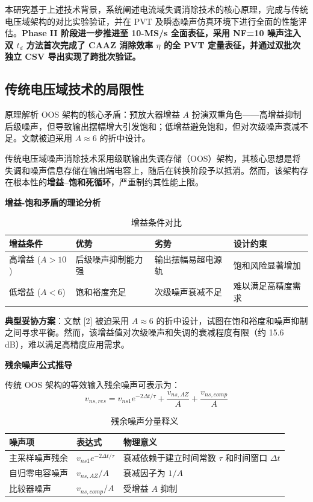 \documentclass[11pt,a4paper,UTF8]{ctexart}
\begin{document}
本研究基于上述技术背景，系统阐述电流域失调消除技术的核心原理，完成与传统电压域架构的对比实验验证，并在 PVT 及瞬态噪声仿真环境下进行全面的性能评估。\textbf{Phase II 阶段进一步推进至 10-MS/s 全面表征，采用 NF=10 噪声注入双 $t_d$ 方法首次完成了 CAAZ 消除效率 $\eta$ 的全 PVT 定量表征，并通过双批次独立 CSV 导出实现了跨批次验证。}

\subsection{传统电压域技术的局限性}

\begin{prinbox}{原理解析}
OOS 架构的核心矛盾：预放大器增益 $A$ 扮演双重角色——高增益抑制后级噪声，但导致输出摆幅增大引发饱和；低增益避免饱和，但对次级噪声衰减不足。文献被迫采用 $A \approx 6$ 的折中设计。
\end{prinbox}

传统电压域噪声消除技术采用级联输出失调存储（OOS）架构，其核心思想是将失调和噪声信息存储在输出端电容上，随后在转换阶段予以抵消。然而，该架构存在根本性的\textbf{增益--饱和死循环}，严重制约其性能上限。

\textbf{增益-饱和矛盾的理论分析}

\begin{table}[htbp]\centering\caption{增益条件对比}\label{tab:gain}\small
\begin{tabular}{llll}\toprule
\textbf{增益条件} & \textbf{优势} & \textbf{劣势} & \textbf{设计约束} \\\midrule
高增益 ($A > 10$) & 后级噪声抑制能力强 & 输出摆幅易超电源轨 & 饱和风险显著增加 \\
低增益 ($A < 6$) & 饱和裕度充足 & 次级噪声衰减不足 & 难以满足高精度需求 \\\bottomrule
\end{tabular}
\end{table}

\textbf{典型妥协方案}：文献 [2] 被迫采用 $A \approx 6$ 的折中设计，试图在饱和裕度和噪声抑制之间寻求平衡。然而，该增益值对次级噪声和失调的衰减程度有限（约 15.6 dB），难以满足高精度应用需求。

\textbf{残余噪声公式推导}

传统 OOS 架构的等效输入残余噪声可表示为：
\begin{equation}
v_{ns,res} = v_{ns1} e^{-2\Delta t/\tau} + \frac{v_{ns,AZ}}{A} + \frac{v_{ns,comp}}{A}
\label{eq:oos}
\end{equation}

\begin{table}[htbp]\centering\caption{残余噪声分量释义}\label{tab:noisecomp}\small
\begin{tabular}{lll}\toprule
\textbf{噪声项} & \textbf{表达式} & \textbf{物理意义} \\\midrule
主采样噪声残余 & $v_{ns1} e^{-2\Delta t/\tau}$ & 衰减依赖于建立时间常数 $\tau$ 和时间窗口 $\Delta t$ \\
自归零电容噪声 & $v_{ns,AZ} / A$ & 衰减因子为 $1/A$ \\
比较器噪声 & $v_{ns,comp} / A$ & 受增益 $A$ 抑制 \\\bottomrule
\end{tabular}
\end{table}
\end{document}
